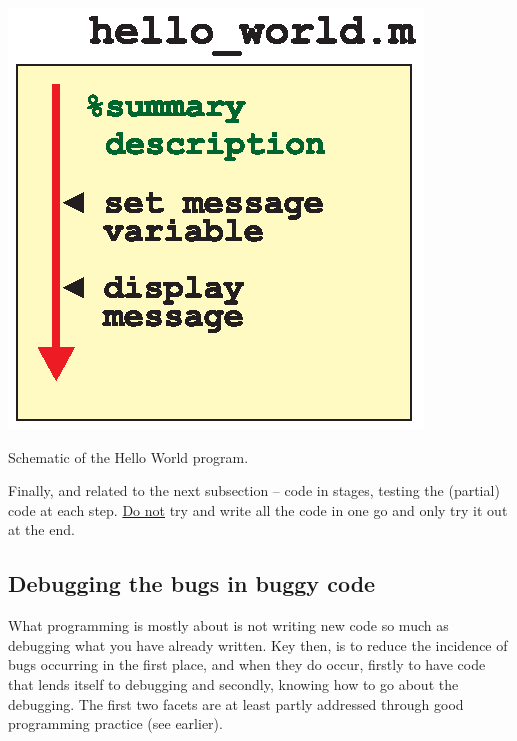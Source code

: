 \documentclass{tufte-book} %
\begin{document}
\begin{marginfigure}[-0.0in]
\includegraphics[width=\linewidth]{ch2-hello_world.eps}
\caption{Schematic of the Hello World program.}
\label{fig:ch2-hello_world}
\end{marginfigure}

Finally, and related to the next subsection -- code in stages, testing the (partial) code at each step. \uline{Do not} try and write all the code in one go and only try it out at the end.


\subsection{Debugging the bugs in buggy code}

What programming is mostly about is not writing new code so much as debugging what you have already written. Key then, is to reduce the incidence of bugs occurring in the first place, and when they do occur, firstly to have code that lends itself to debugging and secondly, knowing how to go about the debugging. The first two facets are at least partly addressed through good programming practice (see earlier).
\end{document}
